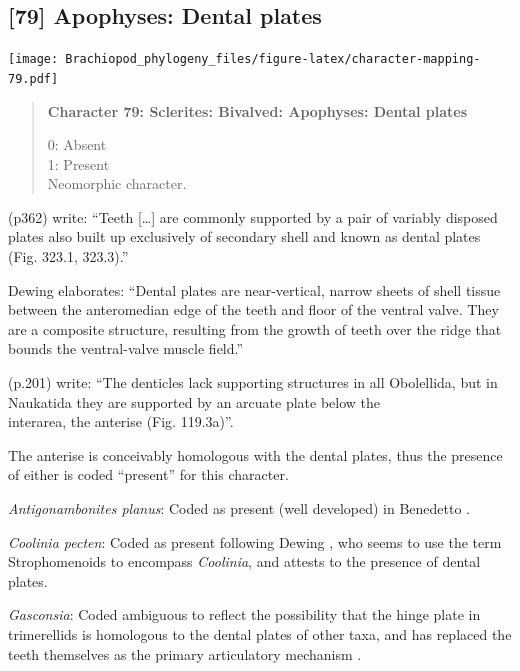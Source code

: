 \documentclass[openany]{book}
\begin{document}
\subsection*{{[}79{]} Apophyses: Dental
plates}\label{apophyses-dental-plates}

\texttt{[image: Brachiopod\_phylogeny\_files/figure-latex/character-mapping-79.pdf]}

\begin{quote}
\textbf{Character 79: Sclerites: Bivalved: Apophyses: Dental plates}

0: Absent\\
1: Present\\
Neomorphic character.
\end{quote}

\citet{Williams1997Introduction} (p362) write: ``Teeth {[}\ldots{}{]}
are commonly supported by a pair of variably disposed plates also built
up exclusively of secondary shell and known as dental plates (Fig.
323.1, 323.3).''

Dewing \citeyearpar{Dewing2001Hingemodifications} elaborates: ``Dental
plates are near-vertical, narrow sheets of shell tissue between the
anteromedian edge of the teeth and floor of the ventral valve. They are
a composite structure, resulting from the growth of teeth over the ridge
that bounds the ventral-valve muscle field.''

\citet{Williams2000LinguliformeaCraniiformea} (p.201) write: ``The
denticles lack supporting structures in all Obolellida, but in Naukatida
they are supported by an arcuate plate below the\\
interarea, the anterise (Fig. 119.3a)''.

The anterise is conceivably homologous with the dental plates, thus the
presence of either is coded ``present'' for this character.

\hypertarget{Antigonambonites_planus-coding-79}{}
\emph{Antigonambonites planus}: Coded as present (well developed) in
Benedetto \citeyearpar{Benedetto2009iChaniella}.

\hypertarget{Coolinia_pecten-coding-79}{}
\emph{Coolinia pecten}: Coded as present following Dewing
\citeyearpar{Dewing2001Hingemodifications}, who seems to use the term
Strophomenoids to encompass \emph{Coolinia}, and attests to the presence
of dental plates.

\hypertarget{Gasconsia-coding-79}{}
\emph{Gasconsia}: Coded ambiguous to reflect the possibility that the
hinge plate in trimerellids is homologous to the dental plates of other
taxa, and has replaced the teeth themselves as the primary articulatory
mechanism \citep[see][p.~184, for details of the
articulation]{Williams2000LinguliformeaCraniiformea}.
\end{document}

